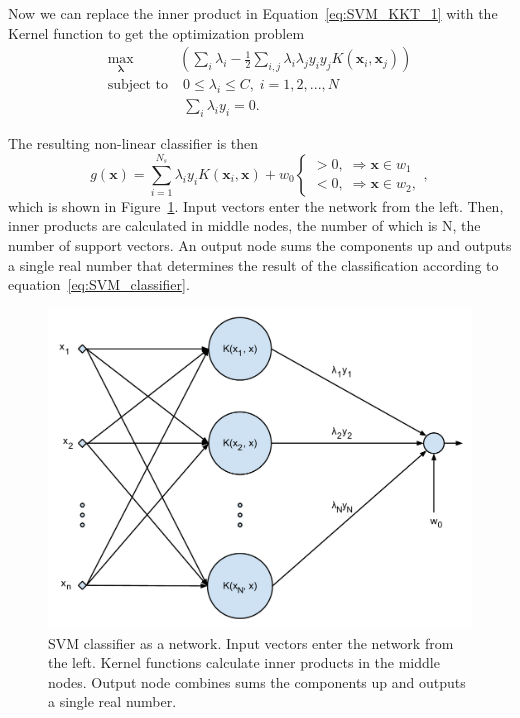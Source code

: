 Now we can replace the inner product in Equation~\ref{eq:SVM_KKT_1} with the Kernel function to get the optimization problem
\begin{align}
\underset{\mathbf{\lambda}}{\operatorname{max}} &\left ( \sum_i \lambda_i - \frac{1}{2} \sum_{i,j} \lambda_i \lambda_j y_i y_j K(\mathbf{x}_i, \mathbf{x}_j) \right ) \label{eq:SVM_final_problem} \\
\text{subject to} &\; 0 \le \lambda_i \le C, \; i = 1, 2, ..., N \\
&\; \sum_i \lambda_i y_i = 0.
\end{align}

The resulting non-linear classifier is then
\begin{equation}
g(\mathbf{x}) = \sum_{i=1}^{N_s} \lambda_i y_i K(\mathbf{x}_i, \mathbf{x}) + w_0 \begin{cases}
> 0, \; \Rightarrow \mathbf{x} \in w_1 \\
< 0, \; \Rightarrow \mathbf{x} \in w_2,
\end{cases} \label{eq:SVM_classifier}, 
\end{equation}
which is shown in Figure~\ref{fig:svm_network}. Input vectors enter the network from the left. Then, inner products are calculated in middle nodes, the number of which is N, the number of support vectors. An output node sums the components up and outputs a single real number that determines the result of the classification according to equation~\ref{eq:SVM_classifier}.


\begin{figure}[here]
\centering
\includegraphics[scale=0.7]{images/svm_network.pdf}
\caption{SVM classifier as a network. Input vectors enter the network from the left. Kernel functions calculate inner products in the middle nodes. Output node combines sums the components up and outputs a single real number.}
\label{fig:svm_network}
\end{figure}



